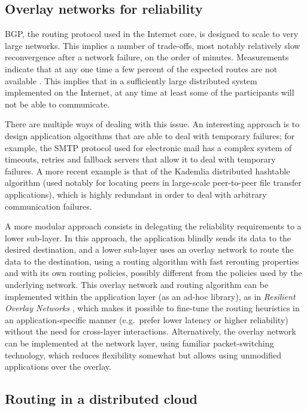\documentclass[conference,letterpaper]{IEEEtran}
\begin{document}
\subsection{Overlay networks for reliability}

BGP, the routing protocol used in the Internet core, is designed to
scale to very large networks.  This implies a number of trade-offs,
most notably relatively slow reconvergence after a network failure, on
the order of minutes.  Measurements indicate that at any one time
a few percent of the expected routes are not available \cite{detour}.
This implies that in a sufficiently large distributed system
implemented on the Internet, at any time at least some of the
participants will not be able to communicate.

There are multiple ways of dealing with this issue.  An interesting
approach is to design application algorithms that are able to deal
with temporary failures; for example, the SMTP protocol used for
electronic mail has a complex system of timeouts, retries and fallback
servers that allow it to deal with temporary failures.  A more recent
example is that of the Kademlia distributed hashtable algorithm (used
notably for locating peers in large-scale peer-to-peer file transfer
applications), which is highly redundant in order to deal with
arbitrary communication failures.

A more modular approach consists in delegating the reliability
requirements to a lower sub-layer.  In this approach, the application
blindly sends its data to the desired destination, and a lower
sub-layer uses an overlay network to route the data to the
destination, using a routing algorithm with fast rerouting properties
and with its own routing policies, possibly different from the
policies used by the underlying network.  This overlay network and
routing algorithm can be implemented within the application layer (as
an ad-hoc library), as in \emph{Resilient Overlay Networks}
\cite{ron}, which makes it possible to fine-tune the routing
heuristics in an application-specific manner (e.g.\ prefer lower
latency or higher reliability) without the need for cross-layer
interactions.  Alternatively, the overlay network can be implemented
at the network layer, using familiar packet-switching technology,
which reduces flexibility somewhat but allows using unmodified
applications over the overlay.

\subsection{Routing in a distributed cloud}
\end{document}
